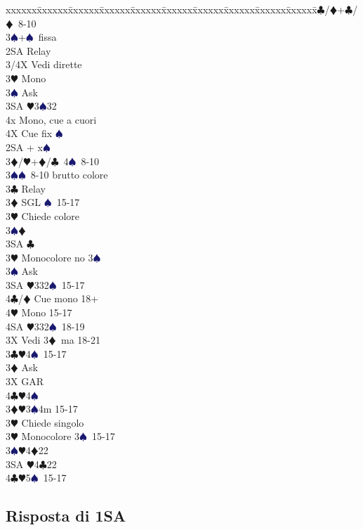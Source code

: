 \documentclass[a4paper,italian]{article}
\newcommand{\BC}{\textcolor{OliveGreen}{$\clubsuit$}}
\newcommand{\BD}{\textcolor{RedOrange}{$\vardiamondsuit$}}
\newcommand{\BH}{\textcolor{Red2}{$\varheartsuit${}}}
\newcommand{\BS}{\textcolor{MidnightBlue}{$\spadesuit${}}}
\newenvironment{bidtable}
{\begin{tabbing}

    xxxxxx\=xxxxxx\=xxxxxx\=xxxxxx\=xxxxxx\=xxxxxx\=xxxxxx\=xxxxxx\=xxxxxx\=xxxxxx\=\kill}
{\end{tabbing} }%
\begin{document}
\begin{multicols*}{2}
\begin{bidtable}
        3\BC/\BD {}+\BC /\BD\ 8-10\\
        3\BS {}+\BS\ fissa\\
        2SA \> Relay\+\\
        3/4X \> Vedi dirette\\
        3\BH \> Mono\+\\
        3\BS \> Ask\+\\
        3SA \BH 3\BS 32\\
        4x \> Mono, cue a cuori\-\\
        4X \> Cue fix \BS \-\-\-\\
        2SA + x\BS \+\\
        3\BD/\BH {}+\BD /\BC\ 4\BS\ 8-10\\
        3\BS {}\BS\ 8-10 brutto colore\\
        3\BC \> Relay\+\\
        3\BD \> SGL \BS\ 15-17\+\\
        3\BH \> Chiede colore\+\\
        3\BS {}\BD \\
        3SA \BC \-\-\\
        3\BH \> Monocolore no 3\BS \+\\
        3\BS \> Ask\+\\
        3SA \BH 332\BS\ 15-17\\
        4\BC/\BD \> Cue mono 18+\\
        4\BH \> Mono 15-17\\
        4SA \BH 332\BS\ 18-19\-\-\\
        3X \> Vedi 3\BD\ ma 18-21\-\-\\
        3\BC {}\BH 4\BS\ 15-17\+\\
        3\BD \> Ask\+\\
        3X \> GAR\\
        4\BC {}\BH 4\BS \-\-\\
        3\BD {}\BH 3\BS 4m 15-17\+\\
        3\BH \> Chiede singolo\-\\
        3\BH \> Monocolore 3\BS\ 15-17\\
        3\BS {}\BH 4\BD 22\\
        3SA \BH 4\BC 22\\
        4\BC {}\BH 5\BS\ 15-17\-\\
    \end{bidtable}
    \columnbreak

    \subsection{Risposta di 1SA}


\end{multicols*}
\end{document}
